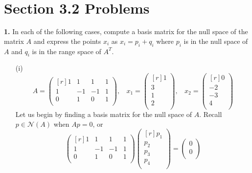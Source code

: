 \documentclass{article}
\begin{document}
    \section*{Section 3.2 Problems}
    \textbf{1.} In each of the following cases, compute a basis matrix for the null space of the matrix $A$ and express the points $x_i$ as $x_i = p_i + q_i$ where $p_i$ is in the null space of $A$ and $q_i$ is in the range space of $A^T$.
    \begin{itemize}
        \item[(i)] 
        \[A = \begin{pmatrix*}[r]
            1 & 1 & 1 & 1\\
            1 & -1 & -1 & 1\\
            0 & 1 & 0 & 1\\
        \end{pmatrix*}, \:\:\:\: x_1 = \begin{pmatrix*}[r]
            1\\
            3\\
            1\\
            2\\
        \end{pmatrix*}, \:\:\:\: x_2 = \begin{pmatrix*}[r]
            0\\
            -2\\
            -3\\
            4\\
        \end{pmatrix*}\]
        Let us begin by finding a basis matrix for the null space of $A$. Recall $p \in \mathcal{N}(A)$ when $Ap = 0$, or
        \[\begin{pmatrix*}[r]
            1 & 1 & 1 & 1\\
            1 & -1 & -1 & 1\\
            0 & 1 & 0 & 1\\
        \end{pmatrix*}\begin{pmatrix*}[r]
            p_1\\
            p_2\\
            p_3\\
            p_4\\
        \end{pmatrix*} = \begin{pmatrix}
            0\\
            0\\

\end{pmatrix}\]
\end{itemize}
\end{document}
